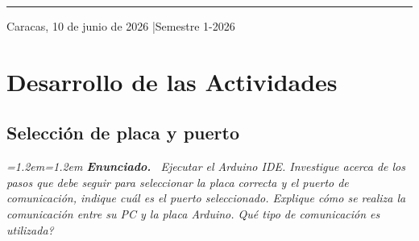 \documentclass[11pt,a4paper]{article}
\newenvironment{enunciado}{%
  \par\smallskip
    \noindent\begingroup\small\itshape
      \leftskip=1.2em\rightskip=1.2em
        \textbf{\upshape Enunciado.}\ }{\par\endgroup\smallskip}
\begin{document}
\begin{titlepage}
                                                                                                         \vfill
                                                                                                         {\color{ucvblue}\rule{\linewidth}{1pt}}
                                                                                                         \begin{center}
                                                                                                           \small Caracas, 10 de junio de 2026 \quad|\quad Semestre 1-2026
                                                                                                           \end{center}
                                                                                                           \end{titlepage}

                                                                                                           \section*{Desarrollo de las Actividades}

                                                                                                           \subsection*{Selecci\'on de placa y puerto}

                                                                                                           \begin{enunciado}
                                                                                                           Ejecutar el Arduino IDE. Investigue acerca de los pasos que debe seguir para seleccionar
                                                                                                           la placa correcta y el puerto de comunicaci\'on, indique cu\'al es el puerto seleccionado.
                                                                                                           Explique c\'omo se realiza la comunicaci\'on entre su PC y la placa Arduino.
                                                                                                           \textquestiondown Qu\'e tipo de comunicaci\'on es utilizada?
                                                                                                           \end{enunciado}
\end{document}
